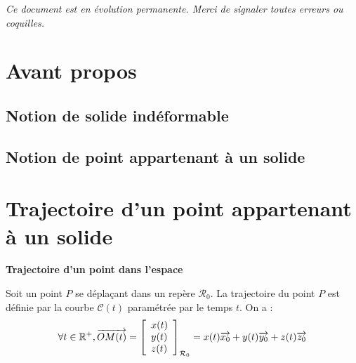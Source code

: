 \documentclass[10pt,oneside]{article}
\begin{document}
\textit{Ce document est en évolution permanente. Merci de signaler toutes erreurs ou coquilles.}
\tableofcontents

 \renewcommand{\baselinestretch}{1.2}
\setlength{\parskip}{2ex plus 0.5ex minus 0.2ex}



\section{Avant propos}

\subsection{Notion de solide indéformable}
\subsection{Notion de point appartenant à un solide}

\section{Trajectoire d'un point appartenant à un solide}


\begin{defi}
\textbf{Trajectoire d'un point dans l'espace}

Soit un point $P$ se déplaçant dans un repère $\mathcal{R}_0$. La trajectoire du point $P$ est définie par la courbe $\mathcal{C}(t)$ paramétrée par le temps $t$. On a : 
$$
\forall t\in \mathbb{R}^+, \overrightarrow{OM(t)}=
\left[
\begin{array}{l}
x(t)\\
y(t)\\
z(t)\\
\end{array}
\right]_{\mathcal{R}_0}
=x(t)\overrightarrow{x_0}+y(t)\overrightarrow{y_0}+z(t)\overrightarrow{z_0}
$$
\end{defi}
\end{document}
